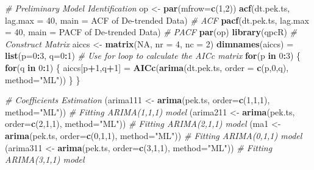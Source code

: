 \documentclass[
]{article}
\newenvironment{Shaded}{\begin{snugshade}}{\end{snugshade}}
\newcommand{\AttributeTok}[1]{\textcolor[rgb]{0.13,0.29,0.53}{#1}}
\newcommand{\CommentTok}[1]{\textcolor[rgb]{0.56,0.35,0.01}{\textit{#1}}}
\newcommand{\ConstantTok}[1]{\textcolor[rgb]{0.56,0.35,0.01}{#1}}
\newcommand{\ControlFlowTok}[1]{\textcolor[rgb]{0.13,0.29,0.53}{\textbf{#1}}}
\newcommand{\DecValTok}[1]{\textcolor[rgb]{0.00,0.00,0.81}{#1}}
\newcommand{\FunctionTok}[1]{\textcolor[rgb]{0.13,0.29,0.53}{\textbf{#1}}}
\newcommand{\NormalTok}[1]{#1}
\newcommand{\OtherTok}[1]{\textcolor[rgb]{0.56,0.35,0.01}{#1}}
\newcommand{\SpecialCharTok}[1]{\textcolor[rgb]{0.81,0.36,0.00}{\textbf{#1}}}
\newcommand{\StringTok}[1]{\textcolor[rgb]{0.31,0.60,0.02}{#1}}
\begin{document}
\begin{Shaded}
\begin{Highlighting}[]
\CommentTok{\# Preliminary Model Identification}
\NormalTok{op }\OtherTok{\textless{}{-}} \FunctionTok{par}\NormalTok{(}\AttributeTok{mfrow=}\FunctionTok{c}\NormalTok{(}\DecValTok{1}\NormalTok{,}\DecValTok{2}\NormalTok{))}
\FunctionTok{acf}\NormalTok{(dt.pek.ts, }\AttributeTok{lag.max =} \DecValTok{40}\NormalTok{, }\AttributeTok{main =} \StringTok{\textquotesingle{}ACF of De{-}trended Data\textquotesingle{}}\NormalTok{) }\CommentTok{\# ACF}
\FunctionTok{pacf}\NormalTok{(dt.pek.ts, }\AttributeTok{lag.max =} \DecValTok{40}\NormalTok{,  }\AttributeTok{main =} \StringTok{\textquotesingle{}PACF of De{-}trended Data\textquotesingle{}}\NormalTok{) }\CommentTok{\# PACF}
\FunctionTok{par}\NormalTok{(op)}
\FunctionTok{library}\NormalTok{(qpcR)}
\CommentTok{\# Construct Matrix}
\NormalTok{aiccs }\OtherTok{\textless{}{-}} \FunctionTok{matrix}\NormalTok{(}\ConstantTok{NA}\NormalTok{, }\AttributeTok{nr =} \DecValTok{4}\NormalTok{, }\AttributeTok{nc =} \DecValTok{2}\NormalTok{)}
\FunctionTok{dimnames}\NormalTok{(aiccs) }\OtherTok{=} \FunctionTok{list}\NormalTok{(}\AttributeTok{p=}\DecValTok{0}\SpecialCharTok{:}\DecValTok{3}\NormalTok{, }\AttributeTok{q=}\DecValTok{0}\SpecialCharTok{:}\DecValTok{1}\NormalTok{)}
\CommentTok{\# Use for loop to calculate the AICc matrix}
\ControlFlowTok{for}\NormalTok{(p }\ControlFlowTok{in} \DecValTok{0}\SpecialCharTok{:}\DecValTok{3}\NormalTok{) \{}
  \ControlFlowTok{for}\NormalTok{(q }\ControlFlowTok{in} \DecValTok{0}\SpecialCharTok{:}\DecValTok{1}\NormalTok{) \{}
\NormalTok{    aiccs[p}\SpecialCharTok{+}\DecValTok{1}\NormalTok{,q}\SpecialCharTok{+}\DecValTok{1}\NormalTok{] }\OtherTok{=} \FunctionTok{AICc}\NormalTok{(}\FunctionTok{arima}\NormalTok{(dt.pek.ts, }\AttributeTok{order =} \FunctionTok{c}\NormalTok{(p,}\DecValTok{0}\NormalTok{,q), }\AttributeTok{method=}\StringTok{"ML"}\NormalTok{))}
\NormalTok{  \} \}}

\CommentTok{\# Coefficients Estimation}
\NormalTok{(arima111 }\OtherTok{\textless{}{-}} \FunctionTok{arima}\NormalTok{(pek.ts, }\AttributeTok{order=}\FunctionTok{c}\NormalTok{(}\DecValTok{1}\NormalTok{,}\DecValTok{1}\NormalTok{,}\DecValTok{1}\NormalTok{), }\AttributeTok{method=}\StringTok{"ML"}\NormalTok{)) }\CommentTok{\# Fitting ARIMA(1,1,1) model}
\NormalTok{(arima211 }\OtherTok{\textless{}{-}} \FunctionTok{arima}\NormalTok{(pek.ts, }\AttributeTok{order=}\FunctionTok{c}\NormalTok{(}\DecValTok{2}\NormalTok{,}\DecValTok{1}\NormalTok{,}\DecValTok{1}\NormalTok{), }\AttributeTok{method=}\StringTok{"ML"}\NormalTok{)) }\CommentTok{\# Fitting ARIMA(2,1,1) model}
\NormalTok{(ma1 }\OtherTok{\textless{}{-}} \FunctionTok{arima}\NormalTok{(pek.ts, }\AttributeTok{order=}\FunctionTok{c}\NormalTok{(}\DecValTok{0}\NormalTok{,}\DecValTok{1}\NormalTok{,}\DecValTok{1}\NormalTok{), }\AttributeTok{method=}\StringTok{"ML"}\NormalTok{)) }\CommentTok{\# Fitting ARIMA(0,1,1) model}
\NormalTok{(arima311 }\OtherTok{\textless{}{-}} \FunctionTok{arima}\NormalTok{(pek.ts, }\AttributeTok{order=}\FunctionTok{c}\NormalTok{(}\DecValTok{3}\NormalTok{,}\DecValTok{1}\NormalTok{,}\DecValTok{1}\NormalTok{), }\AttributeTok{method=}\StringTok{"ML"}\NormalTok{)) }\CommentTok{\# Fitting ARIMA(3,1,1) model}


\end{Highlighting}
\end{Shaded}
\end{document}
